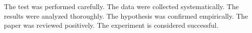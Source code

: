 The test was performed carefully. The data were collected systematically. The results were analyzed thoroughly. The hypothesis was confirmed empirically. The paper was reviewed positively. The experiment is considered successful.
